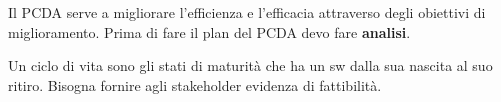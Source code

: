 Il PCDA serve a migliorare l'efficienza e l'efficacia attraverso degli obiettivi di miglioramento. Prima di fare il plan del PCDA devo fare \textbf{analisi}. 

Un ciclo di vita sono gli stati di maturità che ha un sw dalla sua nascita al suo ritiro. Bisogna fornire agli stakeholder evidenza di fattibilità.


